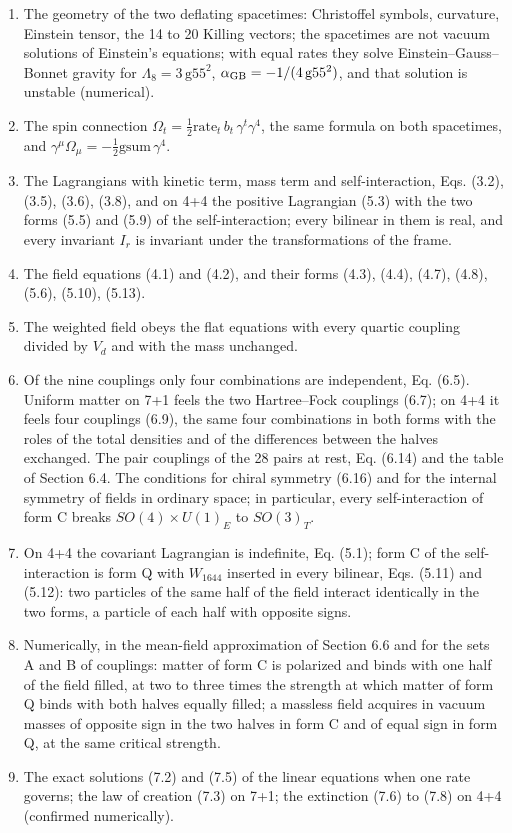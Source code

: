 \documentclass[
  10pt,
]{article}
\providecommand{\tightlist}{%
  \setlength{\itemsep}{0pt}\setlength{\parskip}{0pt}}
\begin{document}
\begin{enumerate}
\def\labelenumi{\arabic{enumi}.}
\tightlist
\item
  The geometry of the two deflating spacetimes: Christoffel symbols,
  curvature, Einstein tensor, the 14 to 20 Killing vectors; the
  spacetimes are not vacuum solutions of Einstein's equations; with
  equal rates they solve Einstein--Gauss--Bonnet gravity for
  \(\Lambda_8=3\,\mathrm{g55}^2\),
  \(\alpha_{\rm GB}=-1/(4\,\mathrm{g55}^2)\), and that solution is
  unstable (numerical).
\item
  The spin connection
  \(\Omega_t=\tfrac12\mathrm{rate}_t\,b_t\,\gamma^t\gamma^4\), the same
  formula on both spacetimes, and
  \(\gamma^\mu\Omega_\mu=-\tfrac12\mathrm{gsum}\,\gamma^4\).
\item
  The Lagrangians with kinetic term, mass term and self-interaction,
  Eqs. (3.2), (3.5), (3.6), (3.8), and on 4+4 the positive Lagrangian
  (5.3) with the two forms (5.5) and (5.9) of the self-interaction;
  every bilinear in them is real, and every invariant \(I_r\) is
  invariant under the transformations of the frame.
\item
  The field equations (4.1) and (4.2), and their forms (4.3), (4.4),
  (4.7), (4.8), (5.6), (5.10), (5.13).
\item
  The weighted field obeys the flat equations with every quartic
  coupling divided by \(V_d\) and with the mass unchanged.
\item
  Of the nine couplings only four combinations are independent, Eq.
  (6.5). Uniform matter on 7+1 feels the two Hartree--Fock couplings
  (6.7); on 4+4 it feels four couplings (6.9), the same four
  combinations in both forms with the roles of the total densities and
  of the differences between the halves exchanged. The pair couplings of
  the 28 pairs at rest, Eq. (6.14) and the table of Section 6.4. The
  conditions for chiral symmetry (6.16) and for the internal symmetry of
  fields in ordinary space; in particular, every self-interaction of
  form C breaks \(SO(4)\times U(1)_E\) to \(SO(3)_T\).
\item
  On 4+4 the covariant Lagrangian is indefinite, Eq. (5.1); form C of
  the self-interaction is form Q with \(W_{1644}\) inserted in every
  bilinear, Eqs. (5.11) and (5.12): two particles of the same half of
  the field interact identically in the two forms, a particle of each
  half with opposite signs.
\item
  Numerically, in the mean-field approximation of Section 6.6 and for
  the sets A and B of couplings: matter of form C is polarized and binds
  with one half of the field filled, at two to three times the strength
  at which matter of form Q binds with both halves equally filled; a
  massless field acquires in vacuum masses of opposite sign in the two
  halves in form C and of equal sign in form Q, at the same critical
  strength.
\item
  The exact solutions (7.2) and (7.5) of the linear equations when one
  rate governs; the law of creation (7.3) on 7+1; the extinction (7.6)
  to (7.8) on 4+4 (confirmed numerically).
\end{enumerate}
\end{document}
